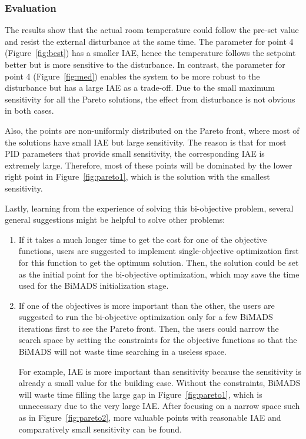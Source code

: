 \documentclass[11pt,oneside,onecolumn,openright]{article}
\begin{document}
\subsubsection{Evaluation}
The results show that the actual room temperature could follow the pre-set value and resist the external disturbance at the same time. The parameter for point 4 (Figure~\ref{fig:best}) has a smaller IAE, hence the temperature follows the setpoint better but is more sensitive to the disturbance. In contrast, the parameter for point 4 (Figure~\ref{fig:med}) enables the system to be more robust to the disturbance but has a large IAE as a trade-off. Due to the small maximum sensitivity for all the Pareto solutions, the effect from disturbance is not obvious in both cases.

Also, the points are non-uniformly distributed on the Pareto front, where most of the solutions have small IAE but large sensitivity. The reason is that for most PID parameters that provide small sensitivity, the corresponding IAE is extremely large. Therefore, most of these points will be dominated by the lower right point in Figure~\ref{fig:pareto1}, which is the solution with the smallest sensitivity.

Lastly, learning from the experience of solving this bi-objective problem, several general suggestions might be helpful to solve other problems:
\begin{enumerate}
  \item If it takes a much longer time to get the cost for one of the objective functions, users are suggested to implement single-objective optimization first for this function to get the optimum solution. Then, the solution could be set as the initial point for the bi-objective optimization, which may save the time used for the BiMADS initialization stage.
  \item If one of the objectives is more important than the other, the users are suggested to run the bi-objective optimization only for a few BiMADS iterations first to see the Pareto front. Then, the users could narrow the search space by setting the constraints for the objective functions so that the BiMADS will not waste time searching in a useless space. 

  For example, IAE is more important than sensitivity because the sensitivity is already a small value for the building case. Without the constraints, BiMADS will waste time filling the large gap in Figure~\ref{fig:pareto1}, which is unnecessary due to the very large IAE. After focusing on a narrow space such as in Figure~\ref{fig:pareto2}, more valuable points with reasonable IAE and comparatively small sensitivity can be found.
\end{enumerate}
\end{document}
